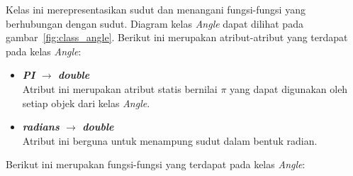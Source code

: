 Kelas ini merepresentasikan sudut dan menangani fungsi-fungsi yang berhubungan dengan sudut. Diagram kelas \textit{Angle} dapat dilihat pada gambar~\ref{fig:class_angle}. Berikut ini merupakan atribut-atribut yang terdapat pada kelas \textit{Angle}:
\begin{itemize}
	\item \textbf{\textit{PI} \(\rightarrow\) \textit{double}}\\
	Atribut ini merupakan atribut statis bernilai \(\pi\) yang dapat digunakan oleh setiap objek dari kelas \textit{Angle}.
	\item \textbf{\textit{radians} \(\rightarrow\) \textit{double}}\\
	Atribut ini berguna untuk menampung sudut dalam bentuk radian.
\end{itemize}
Berikut ini merupakan fungsi-fungsi yang terdapat pada kelas \textit{Angle}:
